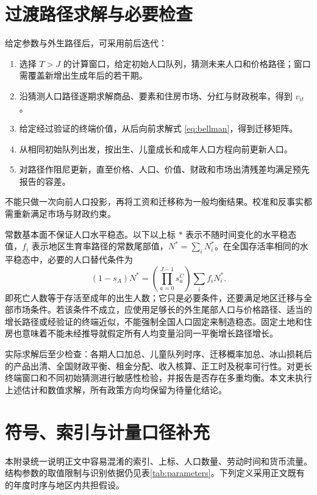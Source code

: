 \documentclass[UTF8,a4paper,zihao=-4,fontset=windows]{ctexart}
\numberwithin{equation}{section}
\begin{document}
\section{过渡路径求解与必要检查}
\label{sec:solution}

给定参数与外生路径后，可采用前后迭代：
\begin{enumerate}
  \item 选择 $T>J$ 的计算窗口，给定初始人口队列，猜测未来人口和价格路径；窗口需覆盖新增出生成年后的若干期。
  \item 沿猜测人口路径逐期求解商品、要素和住房市场、分红与财政税率，得到 $v_{it}$。
  \item 给定经过验证的终端价值，从后向前求解式 \eqref{eq:bellman}，得到迁移矩阵。
  \item 从相同初始队列出发，按出生、儿童成长和成年人口方程向前更新人口。
  \item 对路径作阻尼更新，直至价格、人口、价值、财政和市场出清残差均满足预先报告的容差。
\end{enumerate}
不能只做一次向前人口投影，再将工资和迁移称为一般均衡结果。校准和反事实都需重新满足市场与财政约束。

常数基本面不保证人口水平稳态。以下以上标 $*$ 表示不随时间变化的水平稳态值，$f_i$ 表示地区生育率路径的常数尾部值，$N^*=\sum_iN_i^*$。在全国存活率相同的水平稳态中，必要的人口替代条件为
\begin{equation}
  (1-s_A)N^*
    =\left(\prod_{a=0}^{J-1}s^C_a\right)
       \sum_i f_iN_i^*.
  \label{eq:stationary-population}
\end{equation}
即死亡人数等于存活至成年的出生人数；它只是必要条件，还要满足地区迁移与全部市场条件。若该条件不成立，应使用足够长的外生尾部人口与价格路径、适当的增长路径或经验证的终端近似，不能强制全国人口固定来制造稳态。固定土地和住房也意味着不能未经推导就假定所有人均变量沿同一平衡增长路径增长。

实际求解后至少检查：各期人口加总、儿童队列时序、迁移概率加总、冰山损耗后的产品出清、全国财政平衡、租金分配、收入核算、正工时及税率可行性。对更长终端窗口和不同初始猜测进行敏感性检验，并报告是否存在多重均衡。本文未执行上述估计和数值求解，所有政策方向均保留为待量化结论。

\clearpage
\appendix

\section{符号、索引与计量口径补充}
\label{app:notation}

本附录统一说明正文中容易混淆的索引、上标、人口数量、劳动时间和货币流量。结构参数的取值限制与识别依据仍见表\ref{tab:parameters}。下列定义采用正文既有的年度时序与地区内共担假设。
\end{document}
